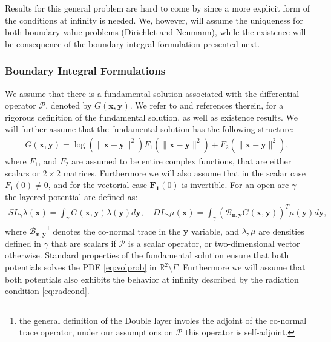 \documentclass{article}
\newcommand{\vx}{\bm{x}}
\newcommand{\IR}{{\mathbb R}}
\newcommand{\cP}{\mathcal{P}}
\newcommand{\bn}{\bm{n}}
\newcommand{\bx}{\bm{x}}
\newcommand{\by}{\bm{y}}
\begin{document}
Results for this general problem are hard to come by since a more explicit form of the conditions at infinity is needed. We, however, will assume the uniqueness for both boundary value problems (Dirichlet and Neumann), while the existence will be consequence of the boundary integral formulation presented next. 
\subsubsection{Boundary Integral Formulations}
\label{sec:bif}
We assume that there is a fundamental solution associated with the differential operator $\cP$, denoted by $G(\vx,\by)$. We refer to \cite[Chapter 6]{mclean2000strongly} and references therein, for a rigorous definition of the fundamental solution, as well as existence results.
 We will further assume that the fundamental solution has the following structure:
\begin{align}
\label{eq:funsolgen}
G(\bx,\by )  =
\log (\|\bx -\by \|^2) F_1(\|\bx -\by \| ^2)+F_2(\|\bx -\by \| ^2),
\end{align}
where $F_1$, and $F_2$ are assumed to be entire complex functions, that are either scalars or $2 \times 2$ matrices. Furthermore we will also assume that in the scalar case $F_1(0) \neq 0$, and for the vectorial case $\mathbf{F_1}(0)$ is invertible. For an open arc $\gamma$ the layered potential are defined as:
\begin{align*}
SL_\gamma \lambda(\bx) = \int_\gamma G(\bx,\by) \lambda(\by) d\by, \quad DL_\gamma \mu(\bx) = \int_\gamma \left(\mathcal{B}_{\bn,\by} G(\bx,\by) \right)^T \mu(\by) d\by,
\end{align*} 
where $\mathcal{B}_{\bn,\by}$\footnote{the general definition of the Double layer involes the adjoint of the co-normal trace operator, under our assumptions on $\cP$ this operator is self-adjoint. } denotes the co-normal trace in the $\by$ variable, and $\lambda, \mu$ are densities defined in $\gamma$ that are scalars if $\cP$ is a scalar operator, or two-dimensional vector otherwise. Standard properties of the fundamental solution ensure that  both potentials solves the PDE \eqref{eq:volprob} in $\IR^2 \setminus \Gamma$. Furthermore we will assume that both potentials also exhibits the behavior at infinity described by the radiation condition \eqref{eq:radcond}. 
\end{document}
